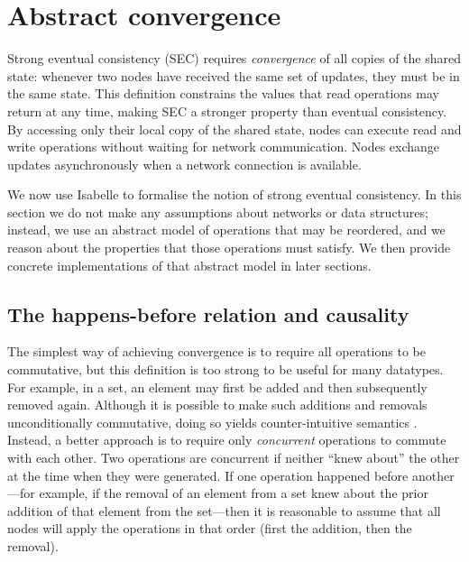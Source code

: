 \section{Abstract convergence}
\label{sect.abstract.convergence}

Strong eventual consistency (SEC) requires \emph{convergence} of all copies of the shared state: whenever two nodes have received the same set of updates, they must be in the same state.
This definition constrains the values that read operations may return at any time, making SEC a stronger property than eventual consistency.
By accessing only their local copy of the shared state, nodes can execute read and write operations without waiting for network communication.
Nodes exchange updates asynchronously when a network connection is available.  

We now use Isabelle to formalise the notion of strong eventual consistency.
In this section we do not make any assumptions about networks or data structures; instead, we use an abstract model of operations that may be reordered, and we reason about the properties that those operations must satisfy.
We then provide concrete implementations of that abstract model in later sections.

\subsection{The happens-before relation and causality}\label{sect.happens.before}

The simplest way of achieving convergence is to require all operations to be commutative, but this definition is too strong to be useful for many datatypes.
For example, in a set, an element may first be added and then subsequently removed again.
Although it is possible to make such additions and removals unconditionally commutative, doing so yields counter-intuitive semantics \cite{Bieniusa:2012wu,Bieniusa:2012gt}.
Instead, a better approach is to require only \emph{concurrent} operations to commute with each other.
Two operations are concurrent if neither ``knew about'' the other at the time when they were generated.
If one operation happened before another---for example, if the removal of an element from a set knew about the prior addition of that element from the set---then it is reasonable to assume that all nodes will apply the operations in that order (first the addition, then the removal).

